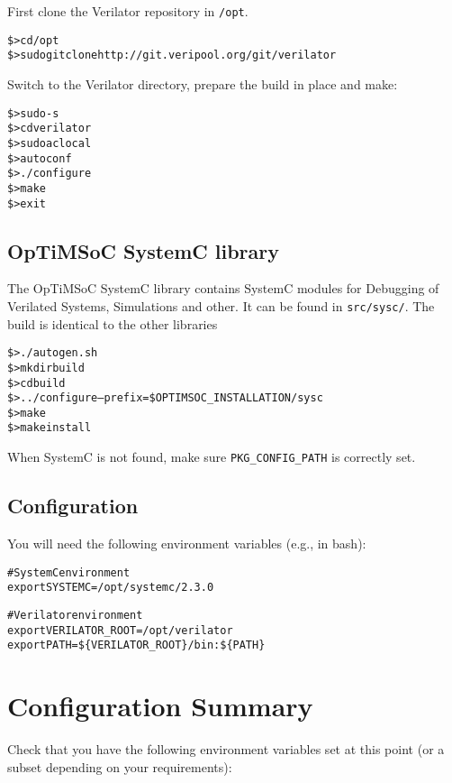 First clone the Verilator repository in \verb|/opt|.

\begin{alltt}
\$> cd /opt
\$> sudo git clone http://git.veripool.org/git/verilator
\end{alltt}

Switch to the Verilator directory, prepare the build in place and make:

\begin{alltt}
\$> sudo -s
\$> cd verilator
\$> sudo aclocal
\$> autoconf
\$> ./configure
\$> make
\$> exit
\end{alltt}

\subsection{OpTiMSoC SystemC library}

The OpTiMSoC SystemC library contains SystemC modules for Debugging of
Verilated Systems, Simulations and other. It can be found in
\verb|src/sysc/|. The build is identical to the other libraries

\begin{alltt}
\$> ./autogen.sh
\$> mkdir build
\$> cd build
\$> ../configure --prefix=\$OPTIMSOC_INSTALLATION/sysc
\$> make
\$> make install
\end{alltt}

When SystemC is not found, make sure \verb|PKG_CONFIG_PATH| is
correctly set.

\subsection{Configuration}

You will need the following environment variables (e.g., in bash):

\begin{alltt}
# SystemC environment
export SYSTEMC=/opt/systemc/2.3.0

# Verilator environment
export VERILATOR\_ROOT=/opt/verilator
export PATH=\$\{VERILATOR_ROOT\}/bin:\$\{PATH\}
\end{alltt}

\section{Configuration Summary}

Check that you have the following environment variables set at this
point (or a subset depending on your requirements):

